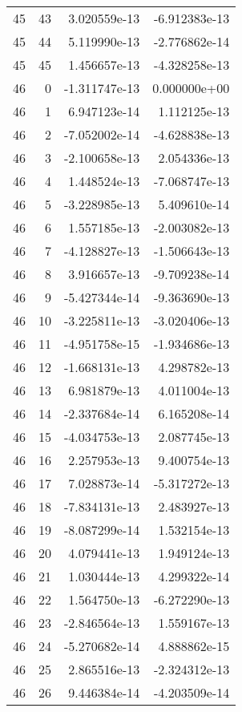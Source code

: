 \begin{tabular}{rrrr}
  45 &   43 &  3.020559e-13 & -6.912383e-13 \\
  45 &   44 &  5.119990e-13 & -2.776862e-14 \\
  45 &   45 &  1.456657e-13 & -4.328258e-13 \\
  46 &    0 & -1.311747e-13 &  0.000000e+00 \\
  46 &    1 &  6.947123e-14 &  1.112125e-13 \\
  46 &    2 & -7.052002e-14 & -4.628838e-13 \\
  46 &    3 & -2.100658e-13 &  2.054336e-13 \\
  46 &    4 &  1.448524e-13 & -7.068747e-13 \\
  46 &    5 & -3.228985e-13 &  5.409610e-14 \\
  46 &    6 &  1.557185e-13 & -2.003082e-13 \\
  46 &    7 & -4.128827e-13 & -1.506643e-13 \\
  46 &    8 &  3.916657e-13 & -9.709238e-14 \\
  46 &    9 & -5.427344e-14 & -9.363690e-13 \\
  46 &   10 & -3.225811e-13 & -3.020406e-13 \\
  46 &   11 & -4.951758e-15 & -1.934686e-13 \\
  46 &   12 & -1.668131e-13 &  4.298782e-13 \\
  46 &   13 &  6.981879e-13 &  4.011004e-13 \\
  46 &   14 & -2.337684e-14 &  6.165208e-14 \\
  46 &   15 & -4.034753e-13 &  2.087745e-13 \\
  46 &   16 &  2.257953e-13 &  9.400754e-13 \\
  46 &   17 &  7.028873e-14 & -5.317272e-13 \\
  46 &   18 & -7.834131e-13 &  2.483927e-13 \\
  46 &   19 & -8.087299e-14 &  1.532154e-13 \\
  46 &   20 &  4.079441e-13 &  1.949124e-13 \\
  46 &   21 &  1.030444e-13 &  4.299322e-14 \\
  46 &   22 &  1.564750e-13 & -6.272290e-13 \\
  46 &   23 & -2.846564e-13 &  1.559167e-13 \\
  46 &   24 & -5.270682e-14 &  4.888862e-15 \\
  46 &   25 &  2.865516e-13 & -2.324312e-13 \\
  46 &   26 &  9.446384e-14 & -4.203509e-14 \\

\end{tabular}
